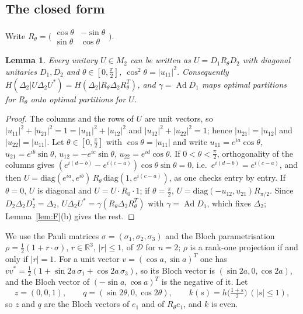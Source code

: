 \documentclass[11pt]{article}
\DeclareMathOperator{\Ad}{Ad}
\newcommand{\R}{\mathbb{R}}
\newcommand{\D}{\mathcal{D}}
\theoremstyle{plain}
\newtheorem{lemma}[theorem]{Lemma}
\theoremstyle{definition}
\theoremstyle{remark}
\begin{document}
\subsection{The closed form}

Write $R_\theta=\bigl(\begin{smallmatrix}\cos\theta&-\sin\theta\\ \sin\theta&\cos\theta\end{smallmatrix}\bigr)$.

\begin{lemma}\label{lem:normal}
Every unitary $U\in M_2$ can be written as $U=D_1R_\theta D_2$ with diagonal unitaries $D_1,D_2$ and $\theta\in[0,\frac\pi2]$,
$\cos^2\theta=|u_{11}|^2$. Consequently $H(\Delta_2|U\Delta_2U^*)=H(\Delta_2|R_\theta\Delta_2R_\theta^T)$, and $\gamma=\Ad D_1$ maps
optimal partitions for $R_\theta$ onto optimal partitions for $U$.
\end{lemma}
\begin{proof}
The columns and the rows of $U$ are unit vectors, so $|u_{11}|^2+|u_{21}|^2=1=|u_{11}|^2+|u_{12}|^2$ and
$|u_{12}|^2+|u_{22}|^2=1$; hence $|u_{21}|=|u_{12}|$ and $|u_{22}|=|u_{11}|$. Let $\theta\in[0,\frac\pi2]$ with $\cos\theta=|u_{11}|$
and write $u_{11}=e^{ia}\cos\theta$, $u_{21}=e^{ib}\sin\theta$, $u_{12}=-e^{ic}\sin\theta$, $u_{22}=e^{id}\cos\theta$. If
$0<\theta<\frac\pi2$, orthogonality of the columns gives $(e^{i(d-b)}-e^{i(c-a)})\cos\theta\sin\theta=0$, i.e.\
$e^{i(d-b)}=e^{i(c-a)}$, and then $U=\mathrm{diag}(e^{ia},e^{ib})\,R_\theta\,\mathrm{diag}(1,e^{i(c-a)})$, as one checks entry by
entry. If $\theta=0$, $U$ is diagonal and $U=U\cdot R_0\cdot1$; if $\theta=\frac\pi2$, $U=\mathrm{diag}(-u_{12},u_{21})R_{\pi/2}$.
Since $D_2\Delta_2D_2^*=\Delta_2$, $U\Delta_2U^*=\gamma(R_\theta\Delta_2R_\theta^T)$ with $\gamma=\Ad D_1$, which fixes
$\Delta_2$; Lemma~\ref{lem:F}(b) gives the rest.
\end{proof}

We use the Pauli matrices $\sigma=(\sigma_1,\sigma_2,\sigma_3)$ and the Bloch parametrisation
$\rho=\frac12(1+r\cdot\sigma)$, $r\in\R^3$, $|r|\le1$, of $\D$ for $n=2$; $\rho$ is a rank-one projection if and only if $|r|=1$. For a
unit vector $v=(\cos a,\sin a)^T$ one has $vv^*=\frac12(1+\sin2a\,\sigma_1+\cos2a\,\sigma_3)$, so its Bloch vector is
$(\sin2a,0,\cos2a)$, and the Bloch vector of $(-\sin a,\cos a)^T$ is the negative of it. Let
\[
  z=(0,0,1),\qquad q=(\sin2\theta,0,\cos2\theta),\qquad k(s)=h\bigl(\tfrac{1+s}2\bigr)\ (|s|\le1),
\]
so $z$ and $q$ are the Bloch vectors of $e_1$ and of $R_\theta e_1$, and $k$ is even.
\end{document}
